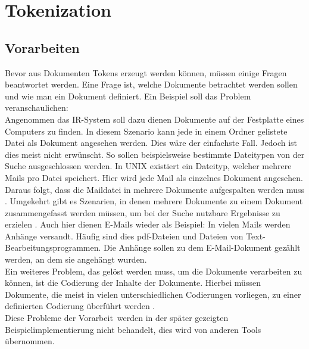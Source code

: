\section{Tokenization}
\subsection{Vorarbeiten}
Bevor aus Dokumenten Tokens erzeugt werden können, müssen einige Fragen beantwortet werden.
Eine Frage ist, welche Dokumente betrachtet werden sollen und wie man ein Dokument definiert. Ein Beispiel soll das Problem veranschaulichen:
\\
Angenommen das IR-System soll dazu dienen Dokumente auf der Festplatte eines Computers zu finden. In diesem Szenario kann jede in einem Ordner gelistete Datei als Dokument angesehen werden. Dies wäre der einfachste Fall. Jedoch ist dies meist nicht erwünscht. So sollen beispielsweise bestimmte Dateitypen von der Suche ausgeschlossen werden. In UNIX existiert ein Dateityp, welcher mehrere Mails pro Datei speichert. Hier wird jede Mail als einzelnes Dokument angesehen. Daraus folgt, dass die Maildatei in mehrere Dokumente aufgespalten werden muss \cite{IR_Intro_Cambridge}.
Umgekehrt gibt es Szenarien, in denen mehrere Dokumente zu einem Dokument zusammengefasst werden müssen, um bei der Suche nutzbare Ergebnisse zu erzielen \cite{IR_Intro_Cambridge}. Auch hier dienen E-Mails wieder als Beispiel: In vielen Mails werden Anhänge versandt. Häufig sind dies pdf-Dateien und Dateien von Text-Bearbeitungsprogrammen. Die Anhänge sollen zu dem E-Mail-Dokument gezählt werden, an dem sie angehängt wurden.
\\
Ein weiteres Problem, das gelöst werden muss, um die Dokumente verarbeiten zu können, ist die Codierung der Inhalte der Dokumente. Hierbei müssen Dokumente, die meist in vielen unterschiedlichen Codierungen vorliegen, zu einer definierten Codierung überführt werden \cite{IR_Intro_Cambridge}.
\\
Diese Probleme der \glqq Vorarbeit\grqq\ werden in der später gezeigten Beispielimplementierung nicht behandelt, dies wird von anderen Tools übernommen.

